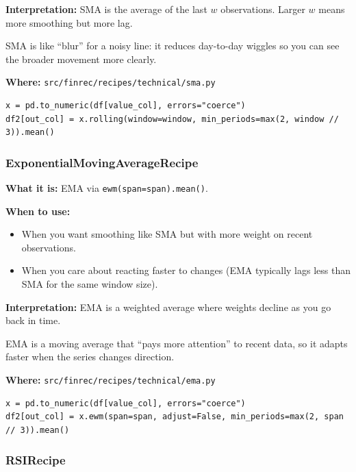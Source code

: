 \documentclass[11pt,a4paper]{article}
\begin{document}
\textbf{Interpretation:} SMA is the average of the last \(w\) observations. Larger \(w\) means more smoothing but more lag.

\begin{intuitionbox}
SMA is like ``blur'' for a noisy line: it reduces day-to-day wiggles so you can see the broader movement more clearly.
\end{intuitionbox}

\textbf{Where:} \texttt{src/finrec/recipes/technical/sma.py}

\begin{lstlisting}
x = pd.to_numeric(df[value_col], errors="coerce")
df2[out_col] = x.rolling(window=window, min_periods=max(2, window // 3)).mean()
\end{lstlisting}

\subsubsection{ExponentialMovingAverageRecipe}\label{sec:ema}

\textbf{What it is:} EMA via \texttt{ewm(span=span).mean()}.

\textbf{When to use:}
\begin{itemize}[leftmargin=2em]
  \item When you want smoothing like SMA but with more weight on recent observations.
  \item When you care about reacting faster to changes (EMA typically lags less than SMA for the same window size).
\end{itemize}

\textbf{Interpretation:} EMA is a weighted average where weights decline as you go back in time.

\begin{intuitionbox}
EMA is a moving average that ``pays more attention'' to recent data, so it adapts faster when the series changes direction.
\end{intuitionbox}

\textbf{Where:} \texttt{src/finrec/recipes/technical/ema.py}

\begin{lstlisting}
x = pd.to_numeric(df[value_col], errors="coerce")
df2[out_col] = x.ewm(span=span, adjust=False, min_periods=max(2, span // 3)).mean()
\end{lstlisting}

\subsubsection{RSIRecipe}\label{sec:rsi}
\end{document}
